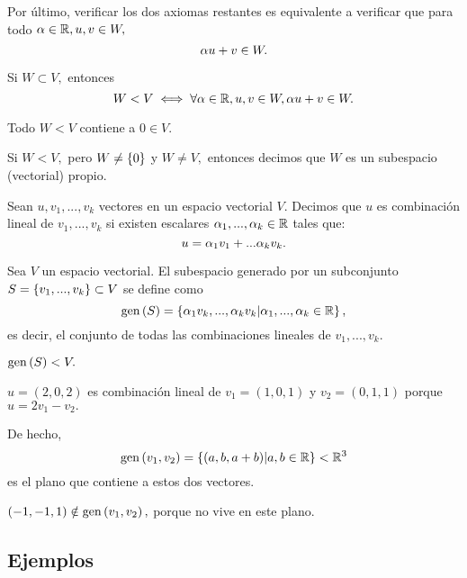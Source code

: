 Por último, verificar los dos axiomas restantes es equivalente a verificar que para todo $\alpha \in \mathbb{R}, u,v \in W,$
$$
\alpha u + v \in W.
$$

\begin{proposicion}
 Si $W\subset V,$ entonces $$
W < V \iff \forall \alpha \in \mathbb{R}, u,v \in W, \alpha u+v\in W.
 $$
\end{proposicion}

\begin{corolario}
 Todo $W < V$ contiene a $0 \in V.$
\end{corolario}


\begin{definicion}
 Si $W< V,$ pero $W\neq\left\{ 0 \right\}$ y $W\neq V,$ entonces decimos que $W$ es un subespacio (vectorial) propio.
\end{definicion}

\begin{definicion}
 Sean $u,v_{1},...,v_{k}$ vectores en un espacio vectorial $V.$ Decimos que $u$ es combinaci\'on lineal de
$v_{1},...,v_{k}$ si existen escalares $\alpha_{1},...,\alpha_{k}\in \mathbb{R}$ tales que:
$$
u=\alpha_{1}v_{1}+...\alpha_{k}v_{k}.
$$
\end{definicion}

\begin{definicion}
 Sea $V$ un espacio vectorial. El subespacio generado por un subconjunto $S=\left\{ v_{1},...,v_{k} \right\}\subset V$ se define
como
 $$
\operatorname{gen}\left( S \right)=\left\{ \alpha_{1}v_{k},...,\alpha_{k}v_{k}\arrowvert \alpha_{1},...,\alpha_{k}\in \mathbb{R} \right\},
 $$
 es decir, el conjunto de todas las combinaciones lineales de $v_{1},...,v_{k}.$
\end{definicion}

\begin{observacion}
 $\operatorname{gen}\left( S \right)<V.$
\end{observacion}


\begin{problema}
 $u=(2,0,2)$ es combinaci\'on lineal de $v_{1}=(1,0,1)$ y $v_{2}=(0,1,1)$ porque $u=2v_{1}-v_{2}.$

 De hecho, $$\operatorname{gen}\left( v_{1},v_{2} \right)=\left\{ (a,b,a+b)\arrowvert a,b \in \mathbb{R} \right\}<\mathbb{R}^{3}$$ es el plano que contiene a estos dos vectores.

 $(-1,-1,1)\notin \operatorname{gen}\left( v_{1},v_{2} \right),$ porque no vive en este plano.
\end{problema}





\subsection*{Ejemplos}

